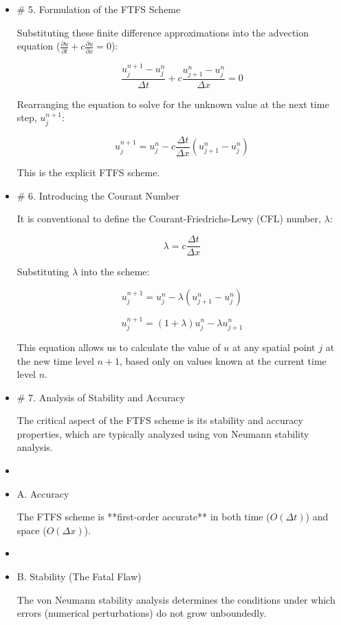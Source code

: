 \documentclass[12pt,a4paper]{report}
\begin{document}
\begin{itemize}
This approximation is first-order accurate in space.

\item \# 5. Formulation of the FTFS Scheme

Substituting these finite difference approximations into the advection equation ($\frac{\partial u}{\partial t} + c \frac{\partial u}{\partial x} = 0$):

$$\frac{u_j^{n+1} - u_j^n}{\Delta t} + c \frac{u_{j+1}^n - u_j^n}{\Delta x} = 0$$

Rearranging the equation to solve for the unknown value at the next time step, $u_j^{n+1}$:

$$u_j^{n+1} = u_j^n - c \frac{\Delta t}{\Delta x} (u_{j+1}^n - u_j^n)$$

This is the explicit FTFS scheme.

\item \# 6. Introducing the Courant Number

It is conventional to define the Courant-Friedrichs-Lewy (CFL) number, $\lambda$:

$$\lambda = c \frac{\Delta t}{\Delta x}$$

Substituting $\lambda$ into the scheme:

$$u_j^{n+1} = u_j^n - \lambda (u_{j+1}^n - u_j^n)$$

$$u_j^{n+1} = (1 + \lambda) u_j^n - \lambda u_{j+1}^n$$

This equation allows us to calculate the value of $u$ at any spatial point $j$ at the new time level $n+1$, based only on values known at the current time level $n$.

\item \# 7. Analysis of Stability and Accuracy

The critical aspect of the FTFS scheme is its stability and accuracy properties, which are typically analyzed using von Neumann stability analysis.

\item \item  A. Accuracy

The FTFS scheme is **first-order accurate** in both time ($O(\Delta t)$) and space ($O(\Delta x)$).

\item \item  B. Stability (The Fatal Flaw)

The von Neumann stability analysis determines the conditions under which errors (numerical perturbations) do not grow unboundedly.


\end{itemize}
\end{document}
